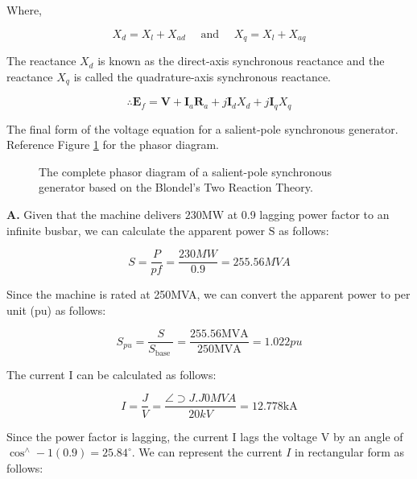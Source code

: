 \documentclass[main.tex]{subfiles}
\begin{document}
\begin{enumerate}
Where,

$$
X_d=X_l+X_{a d} \quad \text { and } \quad X_q=X_l+X_{a q}
$$

The reactance $X_d$ is known as the direct-axis synchronous reactance and the reactance $X_q$ is called the quadrature-axis synchronous reactance.

$$
\therefore \boldsymbol{E}_f=\boldsymbol{V}+\boldsymbol{I}_a \boldsymbol{R}_a+j \boldsymbol{I}_d X_d+j \boldsymbol{I}_q X_q
$$

The final form of the voltage equation for a salient-pole synchronous generator. Reference Figure \ref{fig:22a_b} for the phasor diagram.

\begin{figure}
\centering{}
\caption{The complete phasor diagram of a salient-pole synchronous generator based on the Blondel’s Two Reaction Theory.}
\label{fig:22a_b}
\end{figure}

\textbf{A.} Given that the machine delivers $230 \mathrm{MW}$ at 0.9 lagging power factor to an infinite busbar, we can calculate the apparent power $\mathrm{S}$ as follows:

$$
S=\frac{P}{p f}=\frac{230 M W}{0.9}=255.56 M V A
$$

Since the machine is rated at 250MVA, we can convert the apparent power to per unit (pu) as follows:

$$
S_{p u}=\frac{S}{S_{\text {base }}}=\frac{255.56 \mathrm{MVA}}{250 \mathrm{MVA}}=1.022 p u
$$

The current I can be calculated as follows:

$$
I=\frac{J}{V}=\frac{\angle \supset J . J 0 M V A}{20 k V}=12.778 \mathrm{kA}
$$

Since the power factor is lagging, the current I lags the voltage $\mathrm{V}$ by an angle of $\cos ^{\wedge}-1(0.9)=25.84^{\circ}$. We can represent the current $I$ in rectangular form as follows:


\end{enumerate}
\end{document}
